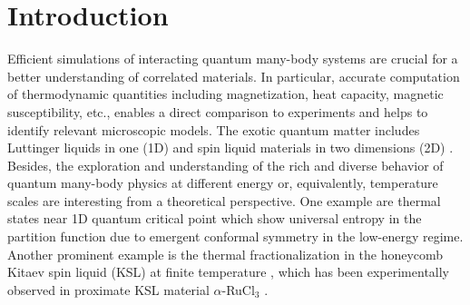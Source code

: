 \documentclass[aps,prx,twocolumn,showpacs,psfig,superscriptaddress,longbibliography]{revtex4-1}
\begin{document}
\date{\today}


\maketitle

\section{Introduction} 

Efficient simulations of interacting quantum many-body systems
are crucial for a better understanding of correlated materials.
In particular, accurate computation of thermodynamic quantities
including magnetization, heat capacity, magnetic susceptibility,
etc., enables a direct comparison to experiments and helps to
identify relevant microscopic models. The exotic quantum matter
includes Luttinger liquids in one (1D)
\cite{Xiang.j+:2017:CopperNitrate, Lake.b+:2013:Multispinon}
and spin liquid materials in two dimensions (2D)
\cite{Balents.l:2010:Spinliquid, Nasu2015:Kitaev,
Shen.y+:2016:Spinliquid, Do.s+:2017:Kitaev,
Yamashita.s+:2017:Spinliquid, Kelly.z.a+:2016:Spinliquid}.
Besides, the exploration and understanding of the rich and diverse
behavior of quantum many-body physics at different energy or,
equivalently, temperature scales are interesting from a theoretical
perspective.  One example  {are} thermal states near 1D quantum
critical point  {which} show universal entropy in the
partition function due to emergent conformal symmetry
\cite{Tu.h:2017:Klein,Tang.w+:2017:CFT,UniEntropy-2017} in the
low-energy regime. Another prominent example is the thermal
fractionalization in the honeycomb Kitaev spin liquid (KSL) at
finite temperature \cite{Nasu2015:Kitaev}, which has been
experimentally observed \cite{Do2017} in proximate KSL material
$\alpha$-RuCl$_3$ \cite{Plumb14,Banerjee2016}.
\end{document}
